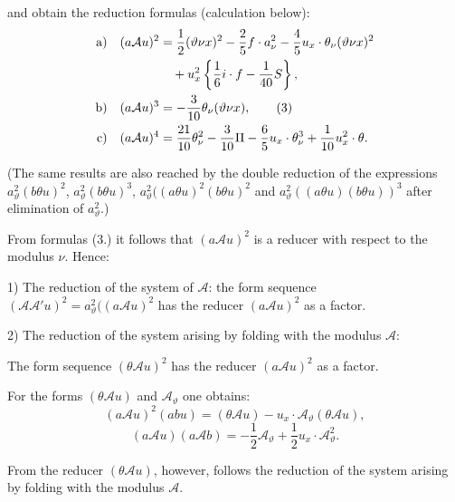\documentclass[11pt]{article}
\newcommand{\A}{\mathcal A}
\begin{document}
and obtain the reduction formulas (calculation below):
\begin{align}
\text{a)}\quad (a\A u)^2
&=\frac12(\vartheta\nu x)^2-\frac25 f\cdot a_\nu^2
-\frac45u_x\cdot\theta_\nu(\vartheta\nu x)^2 \notag\\
&\quad+u_x^2\left\{\frac16 i\cdot f-\frac1{40}S\right\},\notag\\
\text{b)}\quad (a\A u)^3
&=-\frac3{10}\theta_\nu(\vartheta\nu x),\tag{3}\\
\text{c)}\quad (a\A u)^4
&=\frac{21}{10}\theta_\nu^2-\frac3{10}\Pi
-\frac65u_x\cdot\theta_\nu^3+\frac1{10}u_x^2\cdot\theta .\notag
\end{align}

(The same results are also reached by the double reduction of the expressions $a_\vartheta^2(b\theta u)^2$, $a_\vartheta^2(b\theta u)^3$, $a_\vartheta^2((a\theta u)^2(b\theta u)^2$ and $a_\vartheta^2((a\theta u)(b\theta u))^3$ after elimination of $a_\vartheta^2$.)

From formulas (3.) it follows that $(a\A u)^2$ is a reducer with respect to the modulus $\nu$. Hence:

1) The reduction of the system of $\A$: the form sequence $(\A\A' u)^2=a_\vartheta^2((a\A u)^2$ has the reducer $(a\A u)^2$ as a factor.

2) The reduction of the system arising by folding with the modulus $\A$:

The form sequence $(\theta\A u)^2$ has the reducer $(a\A u)^2$ as a factor.

For the forms $(\theta\A u)$ and $\A_\vartheta$ one obtains:
\[
(a\A u)^2(abu)=(\theta\A u)-u_x\cdot\A_\vartheta(\theta\A u),
\]
\[
(a\A u)(a\A b)=-\frac12\A_\vartheta+\frac12u_x\cdot\A_\vartheta^2.
\]

From the reducer $(\theta\A u)$, however, follows the reduction of the system arising by folding with the modulus $\A$.
\end{document}
